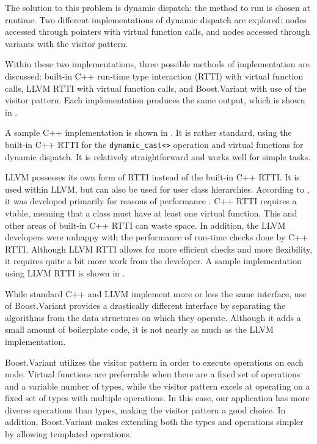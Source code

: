 \documentclass[abstracton]{scrartcl}
\begin{document}
The solution to this problem is dynamic dispatch: the method to run is chosen at runtime. Two different implementations of dynamic dispatch are explored: nodes accessed through pointers with virtual function calls, and nodes accessed through variants with the visitor pattern.

Within these two implementations, three possible methods of implementation are discussed: built-in C++ run-time type interaction (RTTI) with virtual function calls, LLVM RTTI with virtual function calls, and Boost.Variant with use of the visitor pattern. Each implementation produces the same output, which is shown in .

A sample C++ implementation is shown in . It is rather standard, using the built-in C++ RTTI for the \verb|dynamic_cast<>| operation and virtual functions for dynamic dispatch. It is relatively straightforward and works well for simple tasks.

LLVM possesses its own form of RTTI instead of the built-in C++ RTTI\@. It is used within LLVM, but can also be used for user class hierarchies. According to \citeauthor{so-llvm-rtti}, it was developed primarily for reasons of performance \autocite{so-llvm-rtti}. C++ RTTI requires a vtable, meaning that a class must have at least one virtual function. This and other areas of built-in C++ RTTI can waste space. In addition, the LLVM developers were unhappy with the performance of run-time checks done by C++ RTTI\@. Although LLVM RTTI allows for more efficient checks and more flexibility, it requires quite a bit more work from the developer. A sample implementation using LLVM RTTI is shown in .

While standard C++ and LLVM implement more or less the same interface, use of Boost.Variant provides a drastically different interface by separating the algorithms from the data structures on which they operate. Although it adds a small amount of boilerplate code, it is not nearly as much as the LLVM implementation.

Boost.Variant utilizes the visitor pattern in order to execute operations on each node. Virtual functions are preferrable when there are a fixed set of operations and a variable number of types, while the visitor pattern excels at operating on a fixed set of types with multiple operations. In this case, our application has more diverse operations than types, making the visitor pattern a good choice. In addition, Boost.Variant makes extending both the types and operations simpler by allowing templated operations.
\end{document}

